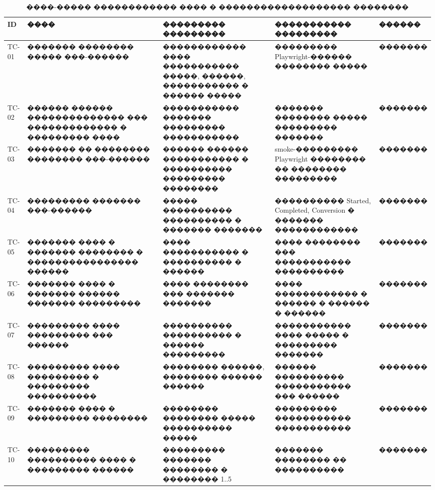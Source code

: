 \begin{table}[p]
\centering
\caption{����-����� ������������ ���� � ������������������� ��������}
\label{tab:ch3-key-tests}
{\fontsize{10pt}{12pt}\selectfont
\setlength{\tabcolsep}{2pt}
\begin{tabularx}{\textwidth}{|>{\centering\arraybackslash}p{12mm}|>{\RaggedRight\arraybackslash}p{45mm}|>{\RaggedRight\arraybackslash}p{40mm}|>{\RaggedRight\arraybackslash}p{40mm}|>{\centering\arraybackslash}p{20mm}|}
\hline
ID & ���� & ��������� ��������� & ����������� ��������� & ������ \\
\hline
TC-01 & ������� �������� ����� ���-������ & ������������ ���� ����������� �����, ������, ����������� � ������ ����� & ��������� Playwright-������ �������� ����� & ������� \\
\hline
TC-02 & ������ ������ �������������� ��� ������������� � ��������� ���� & ����������� ������� ��������� ����������� & ������� �������� ����� ��������� ������� & ������� \\
\hline
TC-03 & ������� �� �������� �������� ���-������ & ������ ������ ����������� � ���������� ��������� �������� & smoke-��������� Playwright �������� �� �������� ��������� & ������� \\
\hline
TC-04 & ��������� ������� ���-������ & ����� ���������� ���������� � ������� ������� & ���������� Started, Completed, Conversion � ������� ������������ & ������� \\
\hline
TC-05 & ������� ���� � ������� �������� � ���������������� ������ & ���� ����������� � ���������� � ������ & ���� �������� ��� ����������� ���������� & ������� \\
\hline
TC-06 & ������� ���� � ������� ������ ������� ��������� & ���� �������� ��� ������� ������� & ���� ������������ � ������ � ������ � ������ & ������� \\
\hline
TC-07 & ��������� ���� ��������� ��� ������ & ���������� ���������� � ������ ��������� & ����������� ���� ����� � ��������� ������� & ������� \\
\hline
TC-08 & ��������� ���� ��������� � ��������� ���������� & �������� ������, �������� ������ ������ & ������ ���������� ����������� ��� ������ & ������� \\
\hline
TC-09 & ������� ���� � ��������� �������� & �������� �������� ����� ���������� ����� & ��������� ����������� ����������� & ������� \\
\hline
TC-10 & ��������� ���������� ���� � ��������� ������ & ��������� ������� �������� � �������� 1..5 & ������� �������� �� ���������� & ������� \\

\end{tabularx}}
\end{table}
